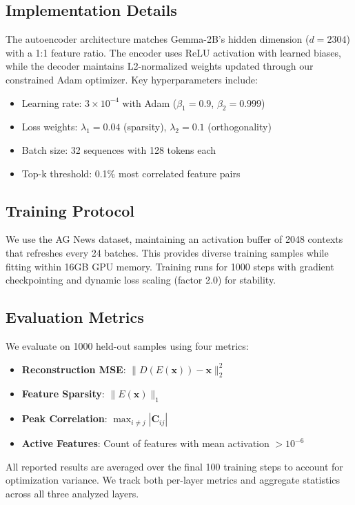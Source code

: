 \documentclass{article} %
\begin{document}
\subsection{Implementation Details}
The autoencoder architecture matches Gemma-2B's hidden dimension ($d=2304$) with a 1:1 feature ratio. The encoder uses ReLU activation with learned biases, while the decoder maintains L2-normalized weights updated through our constrained Adam optimizer. Key hyperparameters include:

\begin{itemize}
    \item Learning rate: $3\times10^{-4}$ with Adam ($\beta_1=0.9$, $\beta_2=0.999$)
    \item Loss weights: $\lambda_1=0.04$ (sparsity), $\lambda_2=0.1$ (orthogonality)
    \item Batch size: 32 sequences with 128 tokens each
    \item Top-k threshold: 0.1\% most correlated feature pairs
\end{itemize}

\subsection{Training Protocol}
We use the AG News dataset, maintaining an activation buffer of 2048 contexts that refreshes every 24 batches. This provides diverse training samples while fitting within 16GB GPU memory. Training runs for 1000 steps with gradient checkpointing and dynamic loss scaling (factor 2.0) for stability.

\subsection{Evaluation Metrics}
We evaluate on 1000 held-out samples using four metrics:
\begin{itemize}
    \item \textbf{Reconstruction MSE}: $\|D(E(\mathbf{x})) - \mathbf{x}\|_2^2$
    \item \textbf{Feature Sparsity}: $\|E(\mathbf{x})\|_1$ 
    \item \textbf{Peak Correlation}: $\max_{i\neq j}|\mathbf{C}_{ij}|$
    \item \textbf{Active Features}: Count of features with mean activation $>10^{-6}$
\end{itemize}

All reported results are averaged over the final 100 training steps to account for optimization variance. We track both per-layer metrics and aggregate statistics across all three analyzed layers.
\end{document}
